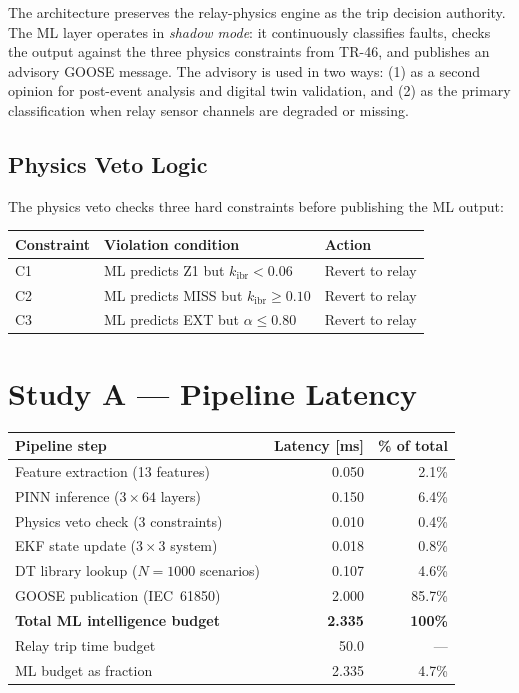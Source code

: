 \documentclass[11pt,a4paper]{article}
\begin{document}
\noindent
The architecture preserves the relay-physics engine as the trip decision
authority.  The ML layer operates in \emph{shadow mode}: it continuously
classifies faults, checks the output against the three physics constraints
from TR-46, and publishes an advisory GOOSE message.  The advisory is used
in two ways: (1) as a second opinion for post-event analysis and digital twin
validation, and (2) as the primary classification when relay sensor channels
are degraded or missing.

\subsection*{Physics Veto Logic}

The physics veto checks three hard constraints before publishing the ML output:

\begin{center}
\begin{tabular}{@{}lll@{}}
\toprule
Constraint & Violation condition & Action \\
\midrule
C1 & ML predicts Z1 but $k_\mathrm{ibr}<0.06$ & Revert to relay \\
C2 & ML predicts MISS but $k_\mathrm{ibr}\geq0.10$ & Revert to relay \\
C3 & ML predicts EXT but $\alpha\leq0.80$ & Revert to relay \\
\bottomrule
\end{tabular}
\end{center}

\section{Study A --- Pipeline Latency}
\label{sec:studyA}

\begin{center}
\begin{tabular}{@{}lrr@{}}
\toprule
Pipeline step & Latency [ms] & \% of total \\
\midrule
Feature extraction (13 features) & 0.050 & 2.1\% \\
PINN inference ($3\times64$ layers) & 0.150 & 6.4\% \\
Physics veto check (3 constraints) & 0.010 & 0.4\% \\
EKF state update ($3\times3$ system) & 0.018 & 0.8\% \\
DT library lookup ($N=1000$ scenarios) & 0.107 & 4.6\% \\
GOOSE publication (IEC~61850) & 2.000 & 85.7\% \\
\midrule
\textbf{Total ML intelligence budget} & \textbf{2.335} & \textbf{100\%} \\
\midrule
Relay trip time budget & 50.0 & --- \\
ML budget as fraction & 2.335 & 4.7\% \\
\bottomrule
\end{tabular}
\end{center}
\end{document}
